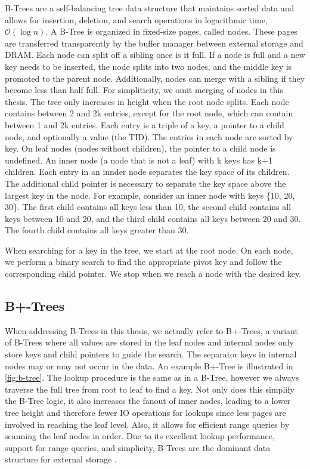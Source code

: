 B-Trees \cite{bayer1970organization} are a self-balancing tree data structure that maintains sorted data and allows for insertion, deletion, and search operations in logarithmic time, $\mathcal{O}(\log n)$.
A B-Tree is organized in fixed-size pages, called nodes. These pages are transferred transparently by the buffer manager between external storage and \ac{DRAM}.
Each node can split off a sibling once is it full. If a node is full and a new key needs to be inserted, the node splits into two nodes, and the middle key is promoted to the parent node.
Additionally, nodes can merge with a sibling if they become less than half full. For simpliticity, we omit merging of nodes in this thesis.
The tree only increases in height when the root node splits.
Each node contains between 2 and 2k entries, except for the root node, which can contain between 1 and 2k entries.
Each entry is a triple of a key, a pointer to a child node, and optionally a value (the \ac{TID}).
The entries in each node are sorted by key. On leaf nodes (nodes without children), the pointer to a child node is undefined.
An inner node (a node that is not a leaf) with k keys has k+1 children.
Each entry in an innder node separates the key space of its children.
The additional child pointer is necessary to separate the key space above the largest key in the node.
For example, consider an inner node with keys \{10, 20, 30\}.
The first child contains all keys less than 10, the second child contains all keys between 10 and 20, and the third child contains all keys between 20 and 30. 
The fourth child contains all keys greater than 30.

When searching for a key in the tree, we start at the root node.
On each node, we perform a binary search to find the appropriate pivot key and follow the corresponding child pointer.
We stop when we reach a node with the desired key.

\subsection*{B+-Trees}
When addressing B-Trees in this thesis, we actually refer to B+-Trees, a variant of B-Trees where all values are stored in the leaf nodes and internal nodes only store keys and child pointers to guide the search.
The separator keys in internal nodes may or may not occur in the data. An example B+-Tree is illustrated in \autoref{fig:b-tree}.
The lookup procedure is the same as in a B-Tree, however we always traverse the full tree from root to leaf to find a key.
Not only does this simplify the B-Tree logic, it also increases the fanout of inner nodes, leading to a lower tree height and therefore fewer \ac{IO} operations for lookups since less pages are involved in reaching the leaf level.
Also, it allows for efficient range queries by scanning the leaf nodes in order.
Due to its excellent lookup performance, support for range queries, and simplicity, B-Trees are the dominant data structure for external storage \cite{mdbs2024slides}.

